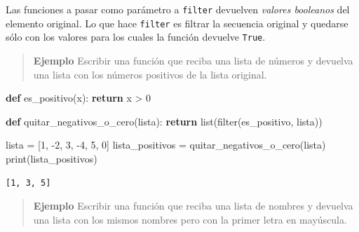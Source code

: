 \documentclass[
  letterpaper,
  DIV=11,
  numbers=noendperiod]{scrreprt}
\newenvironment{Shaded}{\begin{snugshade}}{\end{snugshade}}
\newcommand{\BuiltInTok}[1]{\textcolor[rgb]{0.00,0.23,0.31}{#1}}
\newcommand{\ControlFlowTok}[1]{\textcolor[rgb]{0.00,0.23,0.31}{\textbf{#1}}}
\newcommand{\DecValTok}[1]{\textcolor[rgb]{0.68,0.00,0.00}{#1}}
\newcommand{\KeywordTok}[1]{\textcolor[rgb]{0.00,0.23,0.31}{\textbf{#1}}}
\newcommand{\NormalTok}[1]{\textcolor[rgb]{0.00,0.23,0.31}{#1}}
\newcommand{\OperatorTok}[1]{\textcolor[rgb]{0.37,0.37,0.37}{#1}}
\begin{document}
\begin{tcolorbox}[enhanced jigsaw, arc=.35mm, toptitle=1mm, colframe=quarto-callout-tip-color-frame, bottomtitle=1mm, opacitybacktitle=0.6, colbacktitle=quarto-callout-tip-color!10!white, leftrule=.75mm, coltitle=black, toprule=.15mm, titlerule=0mm, title=\textcolor{quarto-callout-tip-color}{\faLightbulb}\hspace{0.5em}{Tip}, bottomrule=.15mm, rightrule=.15mm, colback=white, breakable, opacityback=0, left=2mm]

Las funciones a pasar como parámetro a \texttt{filter} devuelven
\emph{valores booleanos} del elemento original. Lo que hace
\texttt{filter} es filtrar la secuencia original y quedarse sólo con los
valores para los cuales la función devuelve \texttt{True}.

\end{tcolorbox}

\begin{quote}
\textbf{Ejemplo} Escribir una función que reciba una lista de números y
devuelva una lista con los números positivos de la lista original.
\end{quote}

\begin{Shaded}
\begin{Highlighting}[]
\KeywordTok{def}\NormalTok{ es\_positivo(x):}
  \ControlFlowTok{return}\NormalTok{ x }\OperatorTok{\textgreater{}} \DecValTok{0}

\KeywordTok{def}\NormalTok{ quitar\_negativos\_o\_cero(lista):}
  \ControlFlowTok{return} \BuiltInTok{list}\NormalTok{(}\BuiltInTok{filter}\NormalTok{(es\_positivo, lista))}

\NormalTok{lista }\OperatorTok{=}\NormalTok{ [}\DecValTok{1}\NormalTok{, }\OperatorTok{{-}}\DecValTok{2}\NormalTok{, }\DecValTok{3}\NormalTok{, }\OperatorTok{{-}}\DecValTok{4}\NormalTok{, }\DecValTok{5}\NormalTok{, }\DecValTok{0}\NormalTok{]}
\NormalTok{lista\_positivos }\OperatorTok{=}\NormalTok{ quitar\_negativos\_o\_cero(lista)}
\BuiltInTok{print}\NormalTok{(lista\_positivos)}
\end{Highlighting}
\end{Shaded}

\begin{verbatim}
[1, 3, 5]
\end{verbatim}

\begin{quote}
\textbf{Ejemplo} Escribir una función que reciba una lista de nombres y
devuelva una lista con los mismos nombres pero con la primer letra en
mayúscula.
\end{quote}
\end{document}
